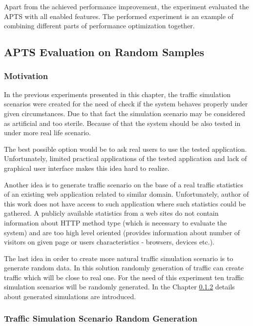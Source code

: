 \documentclass[12pt,a4paper]{article}
\begin{document}
Apart from the achieved performance improvement, the experiment evaluated the APTS with all enabled features. The performed experiment is an example of combining different parts of performance optimization together. 


\subsection{APTS Evaluation on Random Samples}

\subsubsection{Motivation}
In the previous experiments presented in this chapter, the traffic simulation scenarios were created for the need of check if the system behaves properly under given circumstances. Due to that fact the simulation scenario may be considered as artificial and too sterile. Because of that the system should be also tested in under more real life scenario. 

The best possible option would be to ask real users to use the tested application. Unfortunately, limited practical applications of the tested application and lack of graphical user interface makes this idea hard to realize. 

Another idea is to generate traffic scenario on the base of a real traffic statistics of an existing web application related to similar domain. Unfortunately, author of this work does not have access to such application where such statistics could be gathered. A publicly available statistics from a web sites do not contain information about HTTP method type (which is necessary to evaluate the system) and are too high level oriented (provides information about number of visitors on given page or users characteristics - browsers, devices etc.).  

The last idea in order to create more natural traffic simulation scenario is to generate random data. In this solution randomly generation of traffic can create traffic which will be close to real one. For the need of this experiment ten traffic simulation scenarios will be randomly generated. In the Chapter \ref{section:randomgeneration} details about generated simulations are introduced. 

\subsubsection{Traffic Simulation Scenario Random Generation} \label{section:randomgeneration}
\end{document}
